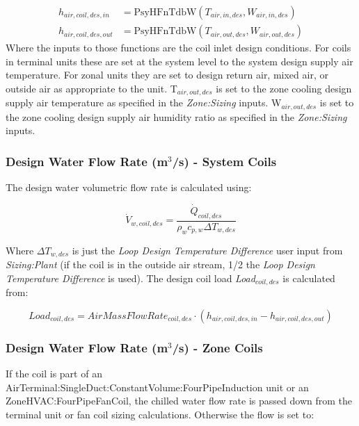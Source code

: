 \begin{equation}
 \begin{array}{lr}
  h_{air,coil,des,in} & = \text{PsyHFnTdbW}\left(T_{air,in,des},W_{air,in,des}\right) \\
  h_{air,coil,des,out} & = \text{PsyHFnTdbW}\left(T_{air,out,des},W_{air,out,des}\right)
 \end{array}
\end{equation}
Where the inputs to those functions are the coil inlet design conditions. For coils in terminal units these are set at the system level to the system design supply air temperature. For zonal units they are set to design return air, mixed air, or outside air as appropriate to the unit. T\(_{air,out,des}\) is set to the zone cooling design supply air temperature as specified in the \emph{Zone:Sizing} inputs. W\(_{air,out,des}\) is set to the zone cooling design supply air humidity ratio as specified in the \emph{Zone:Sizing} inputs.

\subsubsection{Design Water Flow Rate (m\(^{3}\)/s) - System Coils}\label{design-water-flow-rate-m3s---system-coils}

The design water volumetric flow rate is calculated using:

\begin{equation}
\dot{V}_{w,coil,des} = \frac{\dot{Q}_{coil,des}}{\rho_w c_{p,w} \Delta T_{w,des}}
\end{equation}

Where \(\Delta T_{w,des}\) is just the \emph{Loop Design Temperature Difference} user input from \emph{Sizing:Plant} (if the coil is in the outside air stream, 1/2 the \emph{Loop Design Temperature Difference} is used). The design coil load \emph{Load\(_{coil,des}\)} is calculated from:

\begin{equation}
Load_{coil,des} = AirMassFlowRate_{coil,des} \cdot ( h_{air,coil,des,in} - h_{air,coil,des,out} )
\end{equation}

\subsubsection{Design Water Flow Rate (m\(^{3}\)/s) - Zone Coils}\label{design-water-flow-rate-m3s---zone-coils}

If the coil is part of an AirTerminal:SingleDuct:ConstantVolume:FourPipeInduction unit or an ZoneHVAC:FourPipeFanCoil, the chilled water flow rate is passed down from the terminal unit or fan coil sizing calculations. Otherwise the flow is set to:

